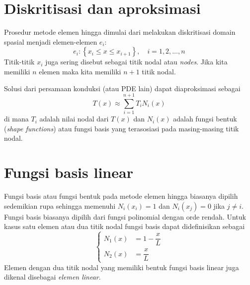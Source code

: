 \section{Diskritisasi dan aproksimasi}

Prosedur metode elemen hingga dimulai dari melakukan diskritisasi domain spasial
menjadi elemen-elemen $e_{i}$:
\begin{equation}
e_{i}: \left\{ x_{i} \leq x \leq x_{i+1} \right\},\quad i=1,2,\ldots,n
\end{equation}
Titik-titik $x_{i}$ juga sering disebut sebagai titik nodal atau \textit{nodes}. 
Jika kita memiliki $n$ elemen maka kita memiliki $n+1$ titik nodal.

Solusi dari persamaan konduksi (atau PDE lain) dapat diaproksimasi sebagai
\begin{equation}
T(x) \approx \sum_{i=1}^{n+1} T_{i} N_{i}(x)
\label{eq:sol_pde_approx}
\end{equation}
di mana $T_i$ adalah nilai nodal dari $T(x)$ dan $N_{i}(x)$ adalah fungsi bentuk
(\textit{shape functions}) atau fungsi basis yang terasosiasi pada masing-masing
titik nodal.


\section{Fungsi basis linear}

Fungsi basis atau fungsi bentuk pada metode elemen hingga biasanya dipilih sedemikian rupa
sehingga
memenuhi $N_{i}(x_{i}) = 1$ dan $N_{i}(x_{j})=0$
jika $j \neq i$.
Fungsi basis biasanya dipilih dari fungsi polinomial dengan orde rendah.
Untuk kasus satu elemen atau dua titik nodal fungsi basis dapat didefinisikan sebagai
\begin{equation}
\begin{cases}
N_{1}(x) & = 1 - \dfrac{x}{L} \\[10pt]
N_{2}(x) & = \dfrac{x}{L}
\end{cases}
\label{eq:linear_shape_functions}
\end{equation}
Elemen dengan dua titik nodal yang memiliki bentuk fungsi basis linear
juga dikenal disebagai \textit{elemen linear}.

